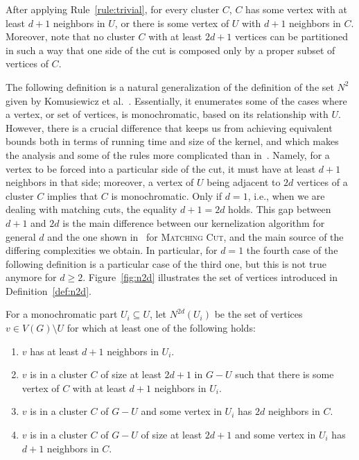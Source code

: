 \documentclass[a4paper,UKenglish,cleveref, autoref]{lipics-v2019}
\newcommand{\pname}[1]{\textsc{#1}}
\begin{document}
After applying Rule~\ref{rule:trivial}, for every cluster $C$, $C$  has some vertex with at least $d+1$ neighbors in $U$, or there is some vertex of $U$ with $d+1$ neighbors in $C$.
Moreover, note that no cluster $C$ with at least $2d+1$ vertices can be partitioned in such a way that one side of the cut is composed only by a proper subset of vertices of $C$.

The following definition is a natural generalization of the definition of the set $N^2$ given by Komusiewicz et al.~\cite{matching_cut_ipec}.
Essentially, it enumerates some of the cases where a vertex, or set of vertices, is monochromatic, based on its relationship with $U$.
However, there is a crucial difference that keeps us from achieving equivalent bounds both in terms of running time and size of the kernel, and which makes the analysis and some of the rules more complicated than in~\cite{matching_cut_ipec}.
Namely, for a vertex to be forced into a particular side of the cut, it must have at least $d+1$ neighbors in that side; moreover, a vertex of $U$ being adjacent to $2d$ vertices of a cluster $C$ implies that $C$ is monochromatic.
Only if $d=1$, i.e., when we are dealing with matching cuts, the equality $d+1 = 2d$ holds.
This gap between $d+1$ and $2d$ is the main difference between our kernelization algorithm for general $d$ and the one shown in~\cite{matching_cut_ipec} for \pname{Matching Cut}, and the main source of the differing complexities we obtain. In particular, for $d=1$ the fourth case of the following definition is a particular case of the third one, but this is not true anymore for $d \geq 2$.
Figure~\ref{fig:n2d} illustrates the set of vertices introduced in Definition~\ref{def:n2d}.

\begin{definition}
    \label{def:n2d}
    For a monochromatic part $U_i \subseteq U$, let $N^{2d}(U_i)$ be the set of vertices $v \in V(G) \setminus U$ for which at least one of the following holds:

    \begin{enumerate}
        \item $v$ has at least $d+1$ neighbors in $U_i$.
        \item $v$ is in a cluster $C$ of size at least $2d+1$ in $G - U$ such that there is some vertex of $C$ with at least $d+1$ neighbors in $U_i$.
        \item $v$ is in a cluster $C$ of $G - U$ and some vertex in $U_i$ has $2d$ neighbors in $C$.
        \item $v$ is in a cluster $C$ of $G - U$ of size at least $2d+1$ and some vertex in $U_i$ has $d+1$ neighbors in $C$.
    \end{enumerate}
\end{definition}
\end{document}
